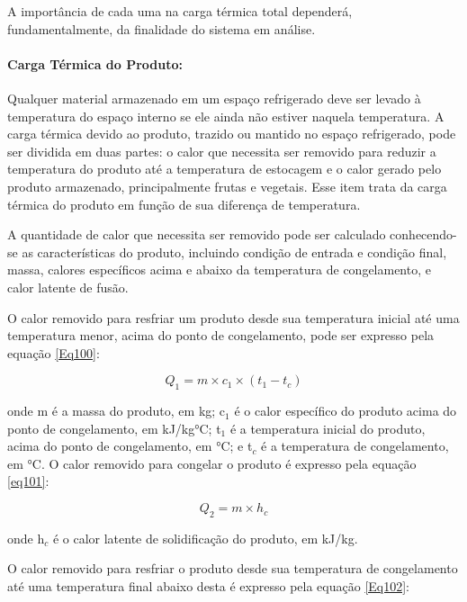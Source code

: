 \documentclass[10pt,a4paper]{article}
\begin{document}
A importância de cada uma na carga térmica total dependerá, fundamentalmente, da finalidade do sistema em análise.


\paragraph*{{ Carga Térmica do Produto:}}

Qualquer material armazenado em um espaço refrigerado deve ser levado à temperatura do espaço interno se ele ainda não estiver naquela temperatura. A carga térmica devido ao produto, trazido ou mantido no espaço refrigerado, pode ser dividida em duas partes: o calor que necessita ser removido para reduzir a temperatura do produto até a temperatura de estocagem e o calor gerado pelo produto armazenado, principalmente frutas
e vegetais. Esse item trata da carga térmica do produto em função de sua diferença de temperatura.

A quantidade de calor que necessita ser removido pode ser calculado conhecendo-se as características do produto, incluindo condição de entrada e condição final, massa, calores específicos acima e abaixo da temperatura de congelamento, e calor latente de fusão.

O calor removido para resfriar um produto desde sua temperatura inicial até uma temperatura menor, acima do ponto de congelamento, pode ser expresso pela equação \ref{Eq100}:

\begin{equation}
    Q_1 = m \times c_1 \times (t_1 - t_c)
    \label{Eq100}
\end{equation}

onde m é a massa do produto, em kg; c$_1$ é o calor específico do produto acima do ponto de congelamento, em kJ/kg°C; t$_1$ é a temperatura inicial do produto, acima do ponto de congelamento, em °C; e t$_c$ é a temperatura de congelamento, em °C.
\newline
O calor removido para congelar o produto é expresso pela equação \ref{eq101}:

\begin{equation}
    Q_2 = m \times h_c
    \label{eq101}
\end{equation}

onde h$_c$ é o calor latente de solidificação do produto, em kJ/kg.

O calor removido para resfriar o produto desde sua temperatura de congelamento até uma temperatura final abaixo desta é expresso pela equação \ref{Eq102}:
\end{document}
